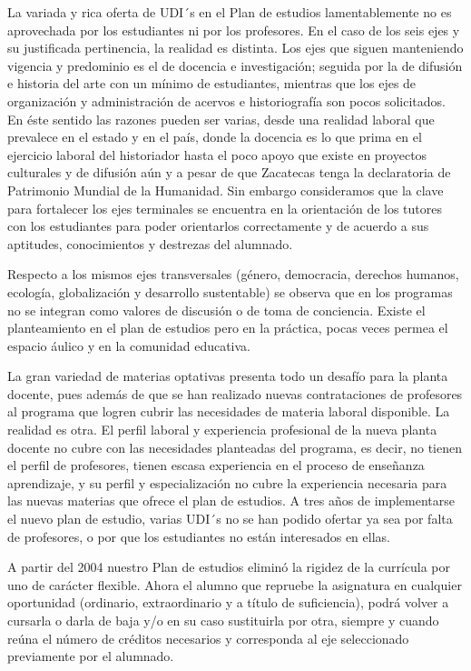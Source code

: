 La variada y rica oferta de UDI´s en el Plan de estudios 
lamentablemente no es aprovechada por los estudiantes ni por los 
profesores. En el caso de los seis ejes y su justificada pertinencia, 
la realidad es distinta. Los ejes que siguen manteniendo vigencia y 
predominio es el de docencia e investigación; seguida por la de 
difusión e  historia del arte con un mínimo de estudiantes, mientras 
que los ejes de  organización y administración de acervos e 
historiografía son pocos solicitados. En éste sentido las razones 
pueden ser varias, desde una realidad laboral que prevalece en el 
estado y en el país, donde la docencia es lo que prima en el ejercicio 
laboral del historiador hasta el poco apoyo que existe en proyectos 
culturales y de difusión aún y a pesar de que Zacatecas tenga la 
declaratoria de Patrimonio Mundial de la Humanidad. Sin embargo 
consideramos que la clave para fortalecer los ejes terminales se 
encuentra en la orientación de los tutores con los estudiantes para 
poder orientarlos correctamente y de acuerdo a sus aptitudes, 
conocimientos y destrezas del alumnado. 

Respecto a los mismos ejes transversales (género, democracia, derechos 
humanos, ecología, globalización y desarrollo sustentable) se observa 
que en los programas no se integran como valores de discusión o de toma 
de conciencia. Existe el planteamiento en el plan de estudios pero en 
la práctica, pocas veces permea el espacio áulico y en la comunidad 
educativa.


La gran variedad de materias optativas presenta todo un desafío para la 
planta docente, pues además de que se han realizado nuevas 
contrataciones de profesores al programa que logren cubrir las 
necesidades de materia laboral disponible. La realidad es otra. El 
perfil laboral y experiencia profesional de la nueva planta docente no 
cubre con las necesidades planteadas del programa, es decir, no tienen 
el perfil de  profesores, tienen escasa experiencia en el proceso de 
enseñanza aprendizaje, y su perfil y especialización no cubre la 
experiencia necesaria para las nuevas materias que ofrece el plan de 
estudios. A tres años de implementarse el nuevo plan de estudio, varias 
UDI´s no se han podido ofertar ya sea por falta de profesores,  o por 
que los estudiantes no están interesados en ellas.

A partir del 2004 nuestro Plan de estudios eliminó la rigidez de la 
currícula  por uno de carácter flexible. Ahora el alumno que repruebe 
la asignatura en cualquier oportunidad (ordinario, extraordinario y a 
título de suficiencia), podrá volver a cursarla o darla de baja y/o en 
su caso sustituirla por otra, siempre y cuando reúna el número de 
créditos necesarios y corresponda al eje seleccionado previamente por 
el alumnado.

